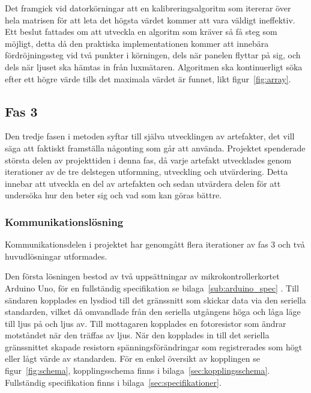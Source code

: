         Det framgick vid datorkörningar att en kalibreringsalgoritm som itererar över hela matrisen för att leta det högsta värdet kommer att vara väldigt ineffektiv. Ett beslut fattades om att utveckla en algoritm som kräver så få steg som möjligt, detta då den praktiska implementationen kommer att innebära fördröjningssteg vid två punkter i körningen, dels när panelen flyttar på sig, och dels när ljuset ska hämtas in från luxmätaren. Algoritmen ska kontinuerligt söka efter ett högre värde tills det maximala värdet är funnet, likt figur~\ref{fig:array}.


    \subsection{Fas 3} %
    \label{sub:steg_3}
        Den tredje fasen i metoden syftar till själva utvecklingen av artefakter, det vill säga att faktiskt framställa någonting som går att använda. Projektet spenderade största delen av projekttiden i denna fas, då varje artefakt utvecklades genom iterationer av de tre delstegen utformning, utveckling och utvärdering. Detta innebar att utveckla en del av artefakten och sedan utvärdera delen för att undersöka hur den beter sig och vad som kan göras bättre.

        \subsubsection{Kommunikationslösning} %
        \label{ssub:utformning_av_kommunikationslosning}
            Kommunikationsdelen i projektet har genomgått flera iterationer av fas 3 och två huvudlösningar utformades.\bigskip 

            Den första lösningen bestod av två uppsättningar av mikrokontrollerkortet Arduino Uno, för en fullständig specifikation se bilaga~\ref{sub:arduino_spec} \cite{ardu}. Till sändaren kopplades en lysdiod till det gränssnitt som skickar data via den seriella standarden, vilket då omvandlade från den seriella utgångens höga och låga läge till ljus på och ljus av. Till mottagaren kopplades en fotoresistor som ändrar motståndet när den träffas av ljus. När den kopplades in till det seriella gränssnittet skapade resistorn spänningsförändringar som registrerades som högt eller lågt värde av standarden. För en enkel översikt av kopplingen se figur~\ref{fig:schema}, kopplingsschema finns i bilaga~\ref{sec:kopplingsschema}. Fullständig specifikation finns i bilaga~\ref{sec:specifikationer}.\bigskip

